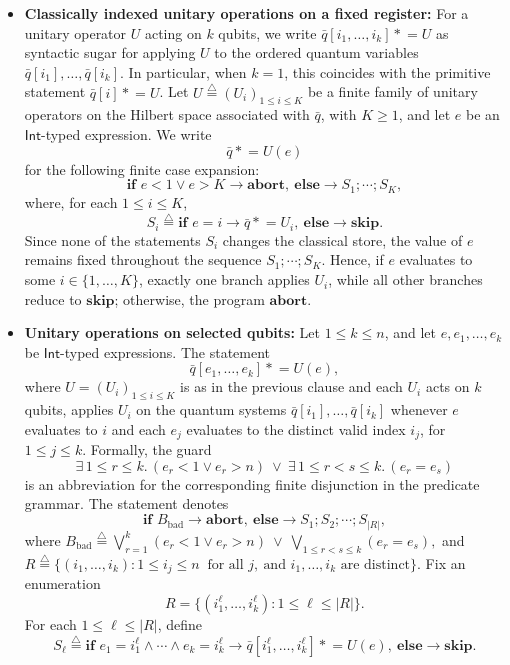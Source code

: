\documentclass[acmsmall,screen,review,anonymous,nonacm]{acmart}
\theoremstyle{defn_style}
\newcommand{\asteq}{\mathrel{*}=}
\begin{document}
\begin{itemize}
    \item \textbf{Classically indexed unitary operations on a fixed register:}
    For a unitary operator \(U\) acting on \(k\) qubits, we write
    \(\bar q[i_1,\ldots,i_k]\asteq U\)
    as syntactic sugar for applying \(U\) to the ordered quantum variables
    \(\bar q[i_1],\ldots,\bar q[i_k]\). In particular, when \(k=1\), this
    coincides with the primitive statement \(\bar q[i]\asteq U\).
    Let \(U\stackrel{\triangle}{=}(U_i)_{1\le i\le K}\) be a finite family
    of unitary operators on the Hilbert space associated with \(\bar q\),
    with \(K\ge 1\), and let \(e\) be an \(\mathsf{Int}\)-typed expression.
    We write
    \[
    \bar q\asteq U(e)
    \]
    for the following finite case expansion:
    \[
    \textbf{if } e<1\lor e>K \rightarrow \textbf{abort},
    \ \textbf{else}\rightarrow S_1;\cdots;S_K,
    \]
    where, for each \(1\le i\le K\),
    \[
    S_i
    \stackrel{\triangle}{=}
    \textbf{if } e=i \rightarrow \bar q\asteq U_i,
    \ \textbf{else}\rightarrow\textbf{skip}.
    \]
    Since none of the statements \(S_i\) changes the classical store, the value
    of \(e\) remains fixed throughout the sequence \(S_1;\cdots;S_K\).
    Hence, if \(e\) evaluates to some \(i\in\{1,\ldots,K\}\), exactly one
    branch applies \(U_i\), while all other branches reduce to
    \(\textbf{skip}\); otherwise, the program \(\textbf{abort}\).

    \item \textbf{Unitary operations on selected qubits:}
    Let \(1\le k\le n\), and let \(e,e_1,\ldots,e_k\) be
    \(\mathsf{Int}\)-typed expressions. The statement
    \[
    \bar q[e_1,\ldots,e_k]\asteq U(e),
    \]
    where \(U=(U_i)_{1\le i\le K}\) is as in the previous clause and each
    \(U_i\) acts on \(k\) qubits, applies \(U_i\) on the quantum systems
    \(\bar q[i_1],\ldots,\bar q[i_k]\) whenever \(e\) evaluates to \(i\)
    and each \(e_j\) evaluates to the distinct valid index \(i_j\), for \(1 \leq j \leq k\).
    Formally, the guard
    \[
    \exists\,1\le r\le k.\,(e_r<1\lor e_r>n)
    \ \lor\
    \exists\,1\le r<s\le k.\,(e_r=e_s)
    \]
    is an abbreviation for the corresponding finite disjunction in the predicate grammar. The statement denotes
    \[
    \textbf{if } B_{\mathrm{bad}}\rightarrow \textbf{abort},
    \ \textbf{else}\rightarrow S_1;S_2;\cdots;S_{|R|},
    \]
    where
    \(B_{\mathrm{bad}}
    \stackrel{\triangle}{=}
    \bigvee_{r=1}^{k}(e_r<1\lor e_r>n)
    \ \lor\
    \bigvee_{1\le r<s\le k}(e_r=e_s),\)
    and
    \(R
    \stackrel{\triangle}{=}
    \{(i_1,\ldots,i_k):
    1\le i_j\le n\ \text{ for all }j,\ \text{and }i_1,\ldots,i_k
    \text{ are distinct}\}.\)
    Fix an enumeration
    \[
    R=\{(i_1^\ell,\ldots,i_k^\ell):1\le \ell\le |R|\}.
    \]
    For each \(1\le \ell\le |R|\), define
    \[
    S_\ell
    \stackrel{\triangle}{=}
    \textbf{if }e_1=i_1^\ell\land\cdots\land e_k=i_k^\ell
    \rightarrow
    \bar q[i_1^\ell,\ldots,i_k^\ell]\asteq U(e),
    \ \textbf{else}\rightarrow\textbf{skip}.
    \]


\end{itemize}
\end{document}
